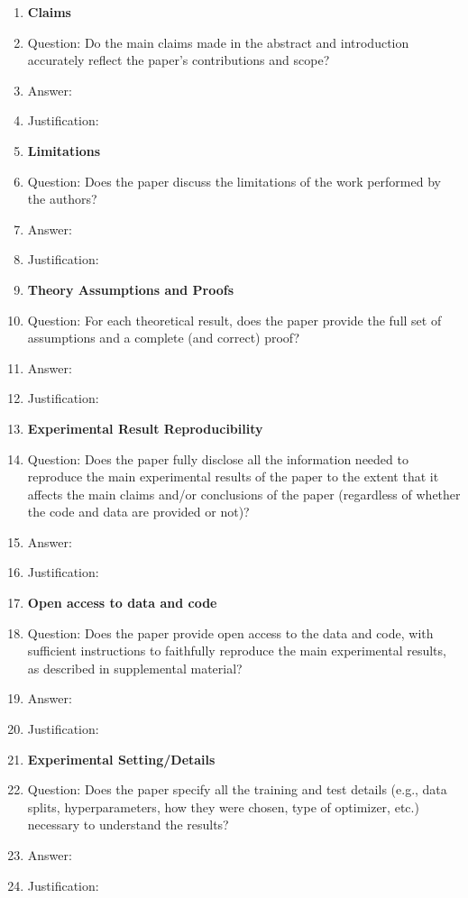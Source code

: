 \documentclass{article}
\begin{document}
\begin{enumerate}

\item {\bf Claims}
    \item[] Question: Do the main claims made in the abstract and introduction accurately reflect the paper's contributions and scope?
    \item[] Answer: \answerTODO{}
    \item[] Justification: \justificationTODO{}

\item {\bf Limitations}
    \item[] Question: Does the paper discuss the limitations of the work performed by the authors?
    \item[] Answer: \answerTODO{}
    \item[] Justification: \justificationTODO{}

\item {\bf Theory Assumptions and Proofs}
    \item[] Question: For each theoretical result, does the paper provide the full set of assumptions and a complete (and correct) proof?
    \item[] Answer: \answerTODO{}
    \item[] Justification: \justificationTODO{}

\item {\bf Experimental Result Reproducibility}
    \item[] Question: Does the paper fully disclose all the information needed to reproduce the main experimental results of the paper to the extent that it affects the main claims and/or conclusions of the paper (regardless of whether the code and data are provided or not)?
    \item[] Answer: \answerTODO{}
    \item[] Justification: \justificationTODO{}

\item {\bf Open access to data and code}
    \item[] Question: Does the paper provide open access to the data and code, with sufficient instructions to faithfully reproduce the main experimental results, as described in supplemental material?
    \item[] Answer: \answerTODO{}
    \item[] Justification: \justificationTODO{}

\item {\bf Experimental Setting/Details}
    \item[] Question: Does the paper specify all the training and test details (e.g., data splits, hyperparameters, how they were chosen, type of optimizer, etc.) necessary to understand the results?
    \item[] Answer: \answerTODO{}
    \item[] Justification: \justificationTODO{}


\end{enumerate}
\end{document}
